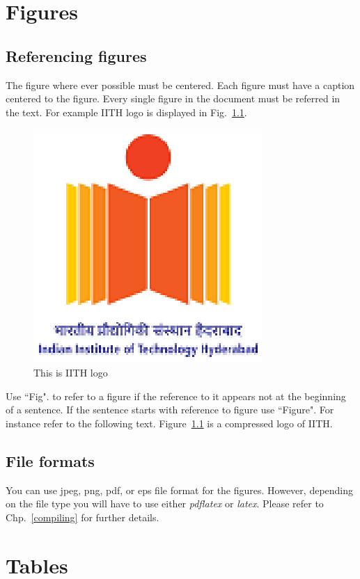 \documentclass[a4paper,twoside]{iiththesis}
\begin{document}
\chapter{Figures}
\section{Referencing figures}
The figure where ever possible must be centered. Each figure must have a caption centered to the figure. Every single figure in the document must be referred in the text. For example IITH logo is displayed in Fig.~\ref{iithlogo}.

\begin{figure}[h]
\centering
\includegraphics[scale=0.5]{logo}
\caption{This is IITH logo}
\label{iithlogo}
\end{figure}

Use ``Fig". to refer to a figure if the reference to it appears not at the beginning of a sentence. If the sentence starts with reference to figure use ``Figure". For instance refer to the following text.
Figure~\ref{iithlogo} is a compressed logo of IITH.\\

\section{File formats}
You can use jpeg, png, pdf, or eps file format for the figures. However, depending on the file type you will have to use either \textit{pdflatex} or \textit{latex}. Please refer to Chp.~\ref{compiling} for further details.


\chapter{Tables}
\end{document}
